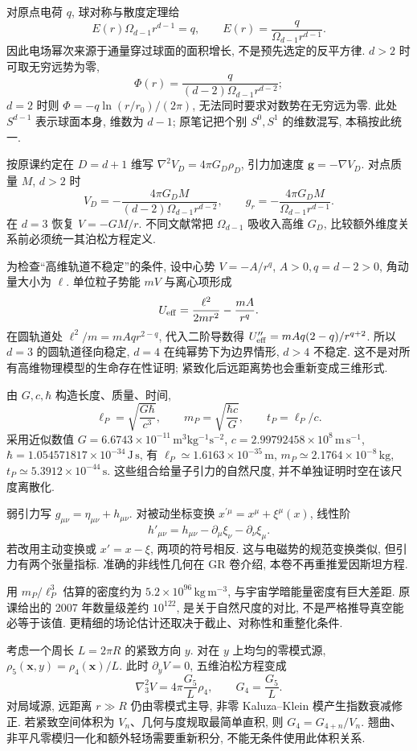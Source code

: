 对原点电荷 $q$, 球对称与散度定理给
\[
 E(r)\Omega_{d-1}r^{d-1}=q,
 \qquad E(r)=\frac{q}{\Omega_{d-1}r^{d-1}}.
\]
因此电场幂次来源于通量穿过球面的面积增长, 不是预先选定的反平方律. $d>2$ 时可取无穷远势为零,
\[
 \Phi(r)=\frac{q}{(d-2)\Omega_{d-1}r^{d-2}};
\]
$d=2$ 时则 $\Phi=-q\ln(r/r_0)/(2\pi)$, 无法同时要求对数势在无穷远为零. 此处 $S^{d-1}$ 表示球面本身, 维数为 $d-1$; 原笔记把个别 $S^0,S^1$ 的维数混写, 本稿按此统一.

按原课约定在 $D=d+1$ 维写 $\nabla^2V_D=4\pi G_D\rho_D$, 引力加速度 $\boldsymbol g=-\nabla V_D$. 对点质量 $M$, $d>2$ 时
\[
 V_D=-\frac{4\pi G_DM}{(d-2)\Omega_{d-1}r^{d-2}},\qquad
 g_r=-\frac{4\pi G_DM}{\Omega_{d-1}r^{d-1}}.
\]
在 $d=3$ 恢复 $V=-GM/r$. 不同文献常把 $\Omega_{d-1}$ 吸收入高维 $G_D$, 比较额外维度关系前必须统一其泊松方程定义.

为检查“高维轨道不稳定”的条件, 设中心势 $V=-A/r^q$, $A>0,q=d-2>0$, 角动量大小为 $\ell$. 单位粒子势能 $mV$ 与离心项形成
\[
 U_{\rm eff}=\frac{\ell^2}{2mr^2}-\frac{mA}{r^q}.
\]
在圆轨道处 $\ell^2/m=mAqr^{2-q}$, 代入二阶导数得 $U_{\rm eff}''=mAq(2-q)/r^{q+2}$. 所以 $d=3$ 的圆轨道径向稳定, $d=4$ 在纯幂势下为边界情形, $d>4$ 不稳定. 这不是对所有高维物理模型的生命存在性证明; 紧致化后远距离势也会重新变成三维形式.

由 $G,c,\hbar$ 构造长度、质量、时间,
\[
 \ell_P=\sqrt{\frac{G\hbar}{c^3}},\qquad
 m_P=\sqrt{\frac{\hbar c}{G}},\qquad t_P=\ell_P/c.
\]
采用近似数值 $G=6.6743\times10^{-11}\,\mathrm{m^3kg^{-1}s^{-2}}$,
$c=2.99792458\times10^8\,\mathrm{m\,s^{-1}}$,
$\hbar=1.054571817\times10^{-34}\,\mathrm{J\,s}$,
有 $\ell_P\simeq1.6163\times10^{-35}\,\mathrm m$,
$m_P\simeq2.1764\times10^{-8}\,\mathrm{kg}$,
$t_P\simeq5.3912\times10^{-44}\,\mathrm s$.
这些组合给量子引力的自然尺度, 并不单独证明时空在该尺度离散化.

弱引力写 $g_{\mu\nu}=\eta_{\mu\nu}+h_{\mu\nu}$. 对被动坐标变换 $x^{\prime\mu}=x^\mu+\xi^\mu(x)$, 线性阶
\[
 h'_{\mu\nu}=h_{\mu\nu}-\partial_\mu\xi_\nu-\partial_\nu\xi_\mu.
\]
若改用主动变换或 $x'=x-\xi$, 两项的符号相反. 这与电磁势的规范变换类似, 但引力有两个张量指标. 准确的非线性几何在 GR 卷介绍, 本卷不再重推爱因斯坦方程.

用 $m_P/\ell_P^3$ 估算的密度约为 $5.2\times10^{96}\,\mathrm{kg\,m^{-3}}$, 与宇宙学暗能量密度有巨大差距. 原课给出的 2007 年数量级差约 $10^{122}$, 是关于自然尺度的对比, 不是严格推导真空能必等于该值. 更精细的场论估计还取决于截止、对称性和重整化条件.

考虑一个周长 $L=2\pi R$ 的紧致方向 $y$. 对在 $y$ 上均匀的零模式源,
$\rho_5(\boldsymbol x,y)=\rho_4(\boldsymbol x)/L$. 此时 $\partial_yV=0$, 五维泊松方程变成
\[
 \nabla_3^2V=4\pi\frac{G_5}{L}\rho_4,
 \qquad G_4=\frac{G_5}{L}.
\]
对局域源, 远距离 $r\gg R$ 仍由零模式主导, 非零 Kaluza--Klein 模产生指数衰减修正. 若紧致空间体积为 $V_n$、几何与度规取最简单直积, 则 $G_4=G_{4+n}/V_n$. 翘曲、非平凡零模归一化和额外轻场需要重新积分, 不能无条件使用此体积关系.


